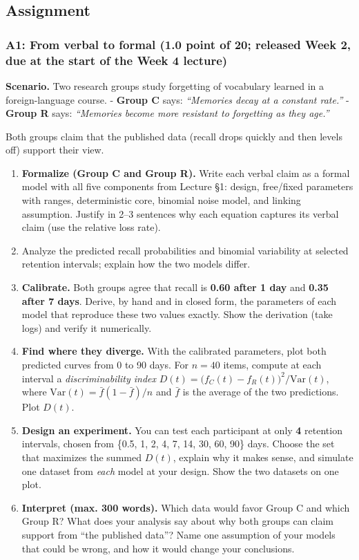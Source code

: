 \subsection{Assignment}

\subsubsection{A1: From verbal to formal (1.0 point of 20; released Week
2, due at the start of the Week 4 lecture)}

\textbf{Scenario.} Two research groups study forgetting of vocabulary
learned in a foreign-language course. - \textbf{Group C} says:
\emph{``Memories decay at a constant rate.''} - \textbf{Group R} says:
\emph{``Memories become more resistant to forgetting as they age.''}

Both groups claim that the published data (recall drops quickly and then
levels off) support their view.

\begin{enumerate}
\def\labelenumi{\arabic{enumi}.}
\item
  \textbf{Formalize (Group C and Group R).} Write each verbal claim as a
  formal model with all five components from Lecture §1: design,
  free/fixed parameters with ranges, deterministic core, binomial noise
  model, and linking assumption. Justify in 2--3 sentences why each
  equation captures its verbal claim (use the relative loss rate).
\item
  Analyze the predicted recall probabilities and binomial variability at selected retention intervals; explain how the two models differ.
\item
  \textbf{Calibrate.} Both groups agree that recall is \textbf{0.60
  after 1 day} and \textbf{0.35 after 7 days}. Derive, by hand and in
  closed form, the parameters of each model that reproduce these two
  values exactly. Show the derivation (take logs) and verify it
  numerically.
\item
  \textbf{Find where they diverge.} With the calibrated parameters, plot
  both predicted curves from 0 to 90 days. For \(n = 40\) items, compute
  at each interval a \emph{discriminability index}
  \(D(t) = \big(f_C(t) - f_R(t)\big)^2 / \mathrm{Var}(t)\), where
  \(\mathrm{Var}(t) = \bar f(1 - \bar f)/n\) and \(\bar f\) is the
  average of the two predictions. Plot \(D(t)\).
\item
  \textbf{Design an experiment.} You can test each participant at only
  \textbf{4} retention intervals, chosen from \{0.5, 1, 2, 4, 7, 14, 30,
  60, 90\} days. Choose the set that maximizes the summed \(D(t)\),
  explain why it makes sense, and simulate one dataset from \emph{each}
  model at your design. Show the two datasets on one plot.
\item
  \textbf{Interpret (max. 300 words).} Which data would favor Group C
  and which Group R? What does your analysis say about why both groups
  can claim support from ``the published data''? Name one assumption of
  your models that could be wrong, and how it would change your
  conclusions.
\end{enumerate}

